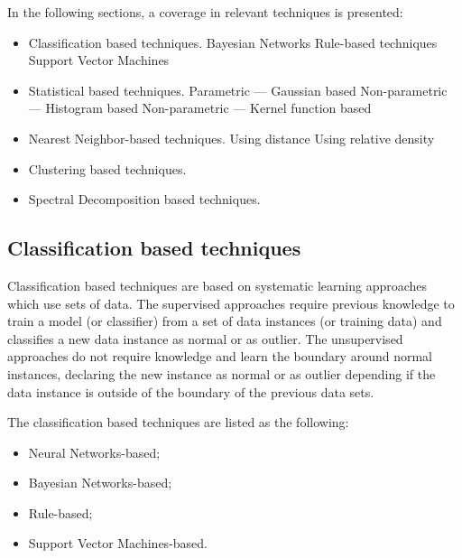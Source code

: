 In the following sections, a coverage in relevant techniques is presented:

\begin{itemize}
	\setlength\itemsep{-0.5em}
	\item Classification based techniques.
	\subitem Bayesian Networks
	\subitem Rule-based techniques
	\subitem Support Vector Machines
	
	\item Statistical based techniques.
	\subitem Parametric --- Gaussian based
	\subitem Non-parametric --- Histogram based
	\subitem Non-parametric --- Kernel function based
	
	\item Nearest Neighbor-based techniques.
	\subitem Using distance
	\subitem Using relative density
	
	\item Clustering based techniques.
	
	\item Spectral Decomposition based techniques.
	
\end{itemize}

\subsection{Classification based techniques}
\label{sec:classbased}

Classification based techniques are based on systematic learning approaches which use sets of data. 
The supervised approaches require previous knowledge to train a model (or classifier) from a set of data instances (or training data) and classifies a new data instance as normal or as outlier. 
The unsupervised approaches do not require knowledge and learn the boundary around normal instances, declaring the new instance as normal or as outlier depending if the data instance is outside of the boundary of the previous data sets.

The classification based techniques are listed as the following:

\begin{itemize}
	\setlength\itemsep{-0.5em}
	\item Neural Networks-based;
	\item Bayesian Networks-based;
	\item Rule-based;
	\item Support Vector Machines-based.
	
\end{itemize}

